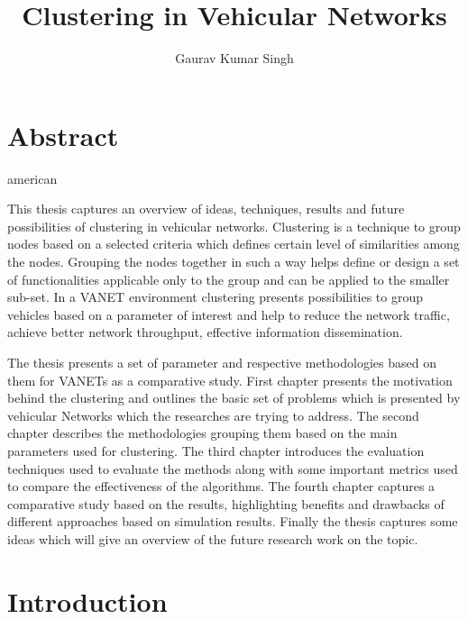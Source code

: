 \documentclass[]{ccs-thesis}
\author{Gaurav Kumar Singh}
\title{Clustering in Vehicular Networks}
\begin{document}

\maketitle

\chapter*{Abstract}
\begin{otherlanguage*}{american}

    This thesis captures an overview of ideas, techniques, results and future possibilities of clustering in vehicular networks.
    Clustering is a technique to group nodes based on a selected criteria which defines certain level of similarities among the nodes.
    Grouping the nodes together in such a way helps define or design a set of functionalities applicable only to the
    group and can be applied to the smaller sub-set. In a \ac{VANET} environment clustering presents possibilities
    to group vehicles based on a parameter of interest and help to reduce the network traffic, achieve better network throughput,
    effective information dissemination.

    The thesis presents a set of parameter and respective methodologies based on them for \ac{VANET}s as a comparative study.
    First chapter presents the motivation behind the clustering and outlines the basic set of problems which is presented by vehicular
    Networks which the researches are trying to address. The second chapter describes the methodologies grouping them based on the main
    parameters used for clustering. The third chapter introduces the evaluation techniques used to evaluate the methods along with some
    important metrics used to compare the effectiveness of the algorithms. The fourth chapter captures a comparative study based on
    the results, highlighting benefits and drawbacks of different approaches based on simulation results. Finally the thesis captures
    some ideas which will give an overview of the future research work on the topic.


\end{otherlanguage*}


\acresetall

\cleardoublepage
\tableofcontents

\cleardoublepage
{}

\chapter{Introduction}
\label{sec:introduction}
\end{document}
